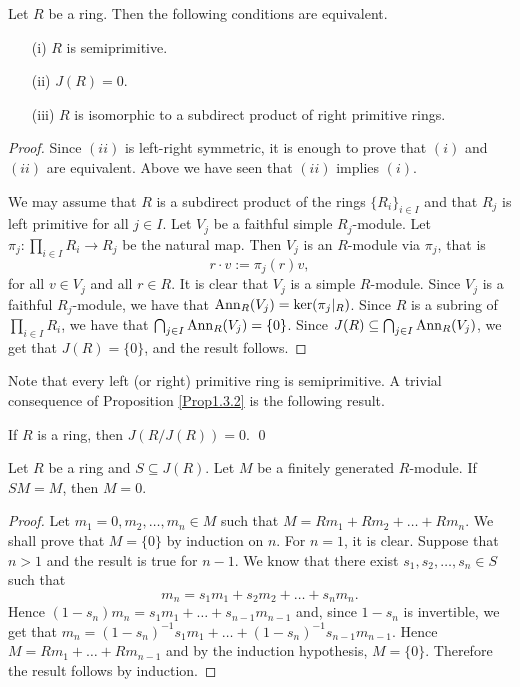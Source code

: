 \begin{proposition}\label{Prop1.3.2}
Let $R$ be a ring. Then the following conditions are equivalent.
\begin{itemize}\item[(i)] $R$ is semiprimitive.
\item[(ii)] $J(R)=0$.
\item[(iii)] $R$ is isomorphic to a subdirect product of right primitive rings.
\end{itemize}
\end{proposition}

\begin{proof}
Since $(ii)$ is left-right symmetric, it is enough to prove that  $(i)$ and
$(ii)$ are equivalent. Above we have seen that $(ii)$ implies $(i)$. 

We may assume that $R$ is a subdirect product of the rings $\{ R_i\} _{i\in I}$
and that $R_j$ is left primitive for all $j\in I$. Let $V_j$ be a faithful simple $R_j$-module. 
Let $\pi _j\colon\prod_{i\in I}R_i\rightarrow R_j$ be the natural map. Then $V_j$ is an $R$-module via $\pi _j$,
that is
$$r\cdot v:=\pi_j(r)v,$$
for all $v\in V_j$ and all $r\in R$.
It is clear that $V_j$ is a simple $R$-module. Since $V_j$ is a faithful $R_j$-module, we have that
$\operatorname{Ann}_R(V_j)=\ker(\pi_j |_R)$. Since $R$ is a subring of $\prod_{i\in I}R_i$, we have that $\bigcap_{j\in I}\operatorname{Ann}_R(V_j)=\{0\}$.
Since $J(R)\subseteq \bigcap_{j\in I}\operatorname{Ann}_R(V_j)$, we get that $J(R)=\{0\}$, and the result follows.
\end{proof}

Note that every left (or right) primitive ring is semiprimitive. A trivial consequence of Proposition \ref{Prop1.3.2} is the following result.

\begin{corollary}\label{Cor1.3.3}
If $R$ is a ring, then $J(R/J(R))=0$. \qed
\end{corollary}


\begin{proposition}
Let $R$ be a ring and $S\subseteq J(R)$. Let $M$ be a finitely generated $R$-module. If $SM=M$, then $M=0$.
\end{proposition}

\begin{proof}
Let $m_1=0,m_2,\dots,m_n\in M$ such that $M=Rm_1+Rm_2+\dots+Rm_n$.
We shall prove that $M=\{0\}$ by induction on $n$. For $n=1$, it is clear. Suppose that $n>1$ and the result is true for $n-1$. 
We know that there exist $s_1,s_2,\dots,s_n\in S$ such that
$$m_n=s_1m_1+s_2m_2+\dots+s_nm_n.$$
Hence $(1-s_n)m_n=s_1m_1+\dots+s_{n-1}m_{n-1}$ and, since $1-s_n$ is invertible, we get that
$m_n=(1-s_n)^{-1}s_1m_1+\dots+(1-s_n)^{-1}s_{n-1}m_{n-1}$. Hence $M=Rm_1+\dots+Rm_{n-1}$ and by the induction hypothesis, $M=\{0\}$.
Therefore the result follows by induction.
\end{proof}

